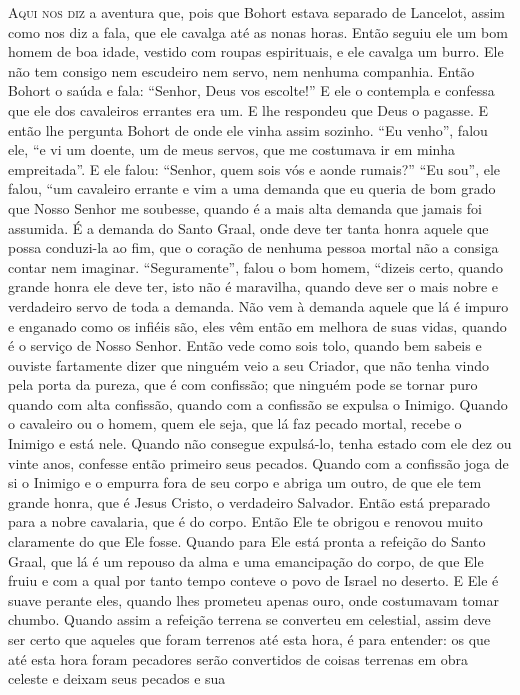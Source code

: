 \textsc{Aqui nos diz} a aventura que, pois que Bohort estava separado de Lancelot, assim
como nos diz a fala, que ele cavalga até as nonas horas. Então seguiu
ele um bom homem de boa idade, vestido com roupas espirituais, e ele cavalga um
burro. Ele não tem consigo nem escudeiro nem servo, nem nenhuma companhia.
Então Bohort o saúda e fala: “Senhor, Deus vos escolte!” E ele o contempla e
confessa que ele dos cavaleiros errantes era um. E lhe respondeu que Deus o
pagasse. E então lhe pergunta Bohort de onde ele vinha assim sozinho. “Eu
venho”, falou ele, “e vi um doente, um de meus servos, que me costumava ir em
minha empreitada”. E ele falou: “Senhor, quem sois vós e aonde rumais?” “Eu
sou”, ele falou, “um cavaleiro errante e vim a uma demanda que eu queria de bom
grado que Nosso Senhor me soubesse, quando é a mais alta demanda que jamais foi
assumida. É a demanda do Santo Graal, onde deve ter tanta honra aquele que
possa conduzi-la ao fim, que o coração de nenhuma pessoa mortal não a consiga
contar nem imaginar. “Seguramente”, falou o bom homem, “dizeis certo, quando
grande honra ele deve ter, isto não é maravilha, quando deve ser o mais nobre e
verdadeiro servo de toda a demanda. Não vem à demanda aquele que lá é
impuro e enganado como os infiéis são, eles vêm então em melhora de suas vidas,
quando é o serviço de Nosso Senhor. Então vede como sois tolo, quando bem
sabeis e ouviste fartamente dizer que ninguém veio a seu Criador, que não tenha
vindo pela porta da pureza, que é com confissão; que ninguém pode se tornar
puro quando com alta confissão, quando com a confissão se expulsa o Inimigo.
Quando o cavaleiro ou o homem, quem ele seja, que lá faz pecado mortal, recebe
o Inimigo e está nele. Quando não consegue expulsá-lo, tenha estado com ele dez
ou vinte anos, confesse então primeiro seus pecados. Quando com a confissão
joga de si o Inimigo e o empurra fora de seu corpo e abriga um outro, de que
ele tem grande honra, que é Jesus Cristo, o verdadeiro Salvador. Então está
preparado para a nobre cavalaria, que é do corpo. Então Ele te
obrigou e renovou muito claramente do que Ele fosse. Quando para Ele está
pronta a refeição do Santo Graal, que lá é um repouso da alma e uma emancipação
do corpo, de que Ele fruiu e com a qual por tanto tempo conteve o povo de
Israel no deserto. E Ele é suave perante eles, quando lhes prometeu apenas
ouro, onde costumavam tomar chumbo. Quando assim a refeição terrena se
converteu em celestial, assim deve ser certo que aqueles que foram terrenos até
esta hora, é para entender: os que até esta hora foram pecadores serão
convertidos de coisas terrenas em obra celeste e deixam seus pecados e sua
